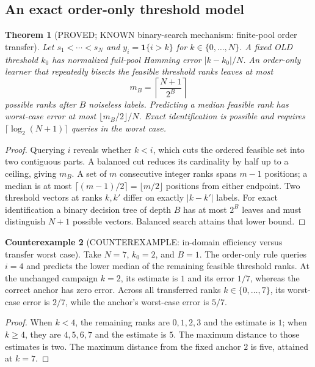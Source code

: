 \documentclass[11pt]{article}
\newtheorem{theorem}{Theorem}[section]
\theoremstyle{definition}
\newtheorem{counterexample}[theorem]{Counterexample}
\theoremstyle{remark}
\begin{document}
\subsection{An exact order-only threshold model}

\begin{theorem}[PROVED; KNOWN binary-search mechanism: finite-pool order transfer]
Let $s_1<\cdots<s_N$ and $y_i=\mathbf{1}\{i>k\}$ for
$k\in\{0,\ldots,N\}$.  A fixed OLD threshold $k_0$ has normalized
full-pool Hamming error $|k-k_0|/N$.  An order-only learner that repeatedly
bisects the feasible threshold ranks leaves at most
\[
 m_B=\left\lceil\frac{N+1}{2^B}\right\rceil
\]
possible ranks after $B$ noiseless labels.  Predicting a median feasible
rank has worst-case error at most $\lfloor m_B/2\rfloor/N$.  Exact
identification is possible and requires
$\lceil\log_2(N+1)\rceil$ queries in the worst case.
\end{theorem}
\begin{proof}
Querying $i$ reveals whether $k<i$, which cuts the ordered feasible set
into two contiguous parts.  A balanced cut reduces its cardinality by
half up to a ceiling, giving $m_B$.  A set of $m$ consecutive integer
ranks spans $m-1$ positions; a median is at most
$\lceil(m-1)/2\rceil=\lfloor m/2\rfloor$ positions from either endpoint.
Two threshold vectors at ranks $k,k'$ differ on exactly $|k-k'|$ labels.
For exact identification a binary decision tree of depth $B$ has at most
$2^B$ leaves and must distinguish $N+1$ possible vectors.  Balanced search
attains that lower bound.
\end{proof}

\begin{counterexample}[COUNTEREXAMPLE: in-domain efficiency versus transfer worst case]
Take $N=7$, $k_0=2$, and $B=1$.  The order-only rule queries $i=4$ and
predicts the lower median of the remaining feasible threshold ranks.
At the unchanged campaign $k=2$, its estimate is $1$ and its error $1/7$,
whereas the correct anchor has zero error.  Across all transferred ranks
$k\in\{0,\ldots,7\}$, its worst-case error is $2/7$, while the anchor's
worst-case error is $5/7$.
\end{counterexample}
\begin{proof}
When $k<4$, the remaining ranks are $0,1,2,3$ and the estimate is $1$;
when $k\geq4$, they are $4,5,6,7$ and the estimate is $5$.  The maximum
distance to those estimates is two.  The maximum distance from the fixed
anchor $2$ is five, attained at $k=7$.
\end{proof}
\end{document}
